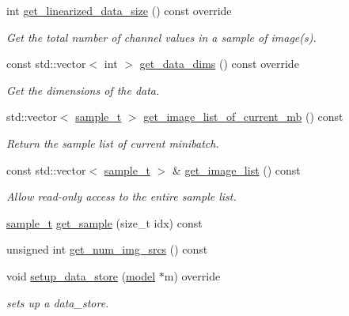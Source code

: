 \begin{DoxyCompactItemize}
\item 
int \hyperlink{classlbann_1_1data__reader__multi__images_a63d7c8f0b674f19840134ee99680f3fc}{get\+\_\+linearized\+\_\+data\+\_\+size} () const override
\begin{DoxyCompactList}\small\item\em Get the total number of channel values in a sample of image(s). \end{DoxyCompactList}\item 
const std\+::vector$<$ int $>$ \hyperlink{classlbann_1_1data__reader__multi__images_aca93e0ab0edf13397de414d41aff1cd1}{get\+\_\+data\+\_\+dims} () const override
\begin{DoxyCompactList}\small\item\em Get the dimensions of the data. \end{DoxyCompactList}\item 
std\+::vector$<$ \hyperlink{classlbann_1_1data__reader__multi__images_a6cbb30001dd633b0d810c417cbbf441e}{sample\+\_\+t} $>$ \hyperlink{classlbann_1_1data__reader__multi__images_a6328561103138b60f22dbd927186f7d2}{get\+\_\+image\+\_\+list\+\_\+of\+\_\+current\+\_\+mb} () const
\begin{DoxyCompactList}\small\item\em Return the sample list of current minibatch. \end{DoxyCompactList}\item 
const std\+::vector$<$ \hyperlink{classlbann_1_1data__reader__multi__images_a6cbb30001dd633b0d810c417cbbf441e}{sample\+\_\+t} $>$ \& \hyperlink{classlbann_1_1data__reader__multi__images_a55dff5f22fcf4f26c7d561998c0481d4}{get\+\_\+image\+\_\+list} () const
\begin{DoxyCompactList}\small\item\em Allow read-\/only access to the entire sample list. \end{DoxyCompactList}\item 
\hyperlink{classlbann_1_1data__reader__multi__images_a6cbb30001dd633b0d810c417cbbf441e}{sample\+\_\+t} \hyperlink{classlbann_1_1data__reader__multi__images_ab940ea9e62d5fac6d6c1b209404abe83}{get\+\_\+sample} (size\+\_\+t idx) const
\item 
unsigned int \hyperlink{classlbann_1_1data__reader__multi__images_a692a657d00afc38dde1dabeb66b1550f}{get\+\_\+num\+\_\+img\+\_\+srcs} () const
\item 
void \hyperlink{classlbann_1_1data__reader__multi__images_ac4c70724fe5f1378a81394cc2e686297}{setup\+\_\+data\+\_\+store} (\hyperlink{classlbann_1_1model}{model} $\ast$m) override
\begin{DoxyCompactList}\small\item\em sets up a data\+\_\+store. \end{DoxyCompactList}\end{DoxyCompactItemize}
